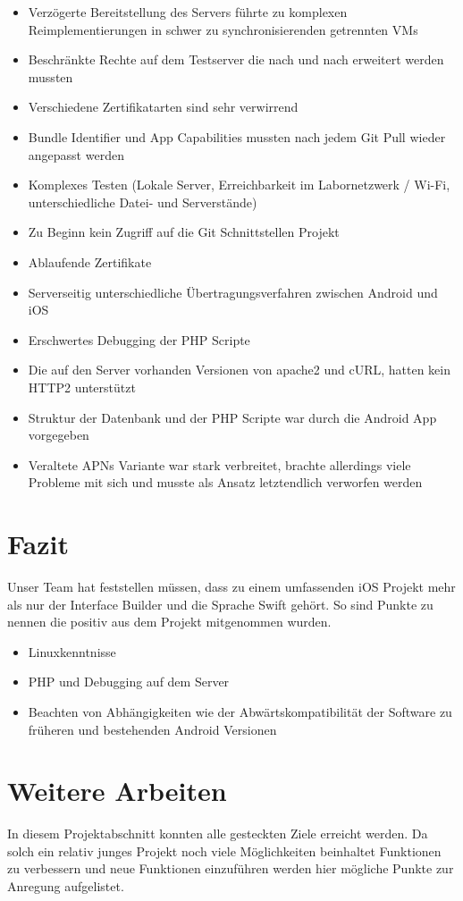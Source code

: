 \begin{itemize}
\item Verzögerte Bereitstellung des Servers führte zu komplexen Reimplementierungen in schwer zu synchronisierenden getrennten VMs
\item Beschränkte Rechte auf dem Testserver die nach und nach erweitert werden mussten
\item Verschiedene Zertifikatarten sind sehr verwirrend
\item Bundle Identifier und App Capabilities mussten nach jedem Git Pull wieder angepasst werden
\item Komplexes Testen (Lokale Server, Erreichbarkeit im Labornetzwerk / Wi-Fi, unterschiedliche Datei- und Serverstände) 
\item Zu Beginn kein Zugriff auf die Git Schnittstellen Projekt
\item Ablaufende Zertifikate
\item Serverseitig unterschiedliche Übertragungsverfahren zwischen Android und iOS
\item Erschwertes Debugging der PHP Scripte
\item Die auf den Server vorhanden Versionen von apache2 und cURL, hatten kein HTTP2 unterstützt  
\item Struktur der Datenbank und der PHP Scripte war durch die Android App vorgegeben
\item Veraltete APNs Variante war stark verbreitet, brachte allerdings viele Probleme mit sich und musste als Ansatz letztendlich verworfen werden
\end{itemize}


\section{Fazit}
Unser Team hat feststellen müssen, dass zu einem umfassenden iOS Projekt mehr als nur der Interface Builder und die Sprache Swift gehört. So sind Punkte zu nennen die positiv aus dem Projekt mitgenommen wurden.
\begin{itemize}
\item Linuxkenntnisse
\item PHP und Debugging auf dem Server
\item Beachten von Abhängigkeiten wie der Abwärtskompatibilität der Software zu früheren und bestehenden Android Versionen
\end{itemize}

\section{Weitere Arbeiten}
In diesem Projektabschnitt konnten alle gesteckten Ziele erreicht werden. Da solch ein relativ junges Projekt noch viele Möglichkeiten beinhaltet Funktionen zu verbessern und neue Funktionen einzuführen werden hier mögliche Punkte zur Anregung aufgelistet.

